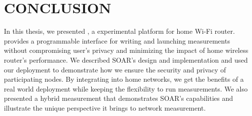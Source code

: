 \chapter{CONCLUSION}
\label{sec.conclusion}
In this thesis, we presented \sysname, a experimental platform for home Wi-Fi router. \sysname provides a programmable interface for writing and launching measurements without compromising user's privacy and minimizing the impact of home wireless router's performance. We described SOAR's design and implementation and used our deployment to demonstrate how we ensure the security and privacy of participating nodes. By integrating \sysname into home networks, we get the benefits of a real world deployment while keeping the flexibility to run measurements. We also presented a hybrid measurement that demonstrates SOAR's capabilities and illustrate the unique perspective it brings to network measurement. 